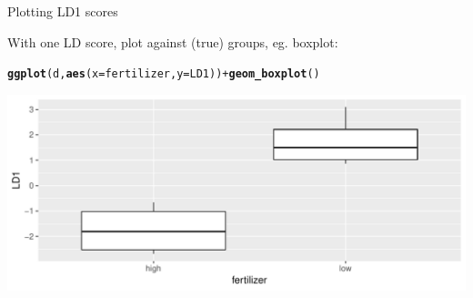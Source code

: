 \documentclass[unknownkeysallowed]{beamer}\usepackage[]{graphicx}\usepackage[]{color}
\makeatletter
\def\maxwidth{ %
  \ifdim\Gin@nat@width>\linewidth
    \linewidth
  \else
    \Gin@nat@width
  \fi
}
\newcommand{\hlopt}[1]{\textcolor[rgb]{0,0,0}{#1}}%
\newcommand{\hlstd}[1]{\textcolor[rgb]{0.345,0.345,0.345}{#1}}%
\newcommand{\hlkwc}[1]{\textcolor[rgb]{0.333,0.667,0.333}{#1}}%
\newcommand{\hlkwd}[1]{\textcolor[rgb]{0.737,0.353,0.396}{\textbf{#1}}}%
\newenvironment{kframe}{%
 \def\at@end@of@kframe{}%
 \ifinner\ifhmode%
  \def\at@end@of@kframe{\end{minipage}}%
  \begin{minipage}{\columnwidth}%
 \fi\fi%
 \def\FrameCommand##1{\hskip\@totalleftmargin \hskip-\fboxsep
 \colorbox{shadecolor}{##1}\hskip-\fboxsep
     \hskip-\linewidth \hskip-\@totalleftmargin \hskip\columnwidth}%
 \MakeFramed {\advance\hsize-\width
   \@totalleftmargin\z@ \linewidth\hsize
   \@setminipage}}%
 {\par\unskip\endMakeFramed%
 \at@end@of@kframe}
\newenvironment{knitrout}{}{} %
\makeatother
\begin{document}
\begin{frame}[fragile]{Plotting LD1 scores}
  
  With one LD score, plot against (true) groups, eg. boxplot:
  
\begin{knitrout}
\color{fgcolor}\begin{kframe}
\begin{alltt}
\hlkwd{ggplot}\hlstd{(d,}\hlkwd{aes}\hlstd{(}\hlkwc{x}\hlstd{=fertilizer,}\hlkwc{y}\hlstd{=LD1))}\hlopt{+}\hlkwd{geom_boxplot}\hlstd{()}
\end{alltt}
\end{kframe}
\includegraphics[width=\maxwidth]{figure/unnamed-chunk-270-1} 

\end{knitrout}
  
\end{frame}
\end{document}
